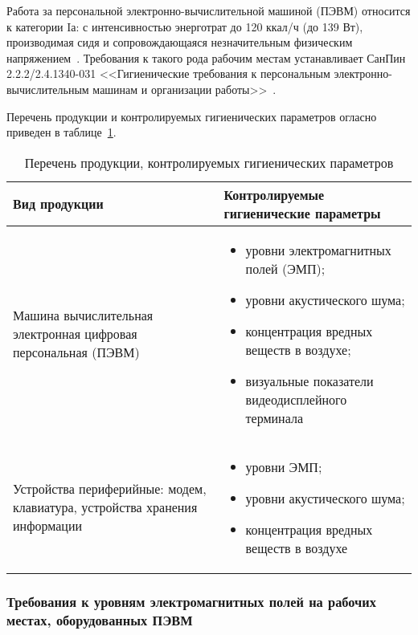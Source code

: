 Работа за персональной электронно-вычислительной машиной 
(ПЭВМ) относится к категории Iа: с интенсивностью энерготрат до 120 ккал/ч (до
139 Вт), производимая сидя и сопровождающаяся незначительным физическим напряжением~\cite{sanpin_mikroclimate}.
Требования к такого рода рабочим местам устанавливает СанПин 2.2.2/2.4.1340-031 
<<Гигиенические требования к персональным электронно-вычислительным машинам
и организации работы>>~\cite{sanpin_2.4.1340-03}. 

Перечень продукции и контролируемых гигиенических параметров огласно~\cite{sanpin_2.4.1340-03} 
приведен в таблице~\ref{tab:life_1}.

\begin{table}[h!]
\caption{ Перечень продукции, контролируемых гигиенических параметров }
\label{tab:life_1}
\begin{center}
\begin{tabularx}{\linewidth}{|X|X|}
\hline
Вид продукции & Контролируемые гигиенические параметры\\
\hline
\item Машина вычислительная электронная цифровая персональная (ПЭВМ) & 
\begin{itemize}
 \item уровни электромагнитных полей (ЭМП);
 \item уровни акустического шума;
 \item концентрация вредных веществ в воздухе;
 \item визуальные показатели видеодисплейного терминала
\end{itemize}									     
\\
\hline
\item Устройства периферийные: модем, клавиатура, устройства хранения информации & 
\begin{itemize}
 \item уровни ЭМП;
 \item уровни акустического шума;
 \item концентрация вредных веществ в воздухе
\end{itemize}
 \\
\hline
\end{tabularx}
\end{center}
\end{table}


\subsubsection{Требования к уровням электромагнитных полей на рабочих местах, оборудованных ПЭВМ}

